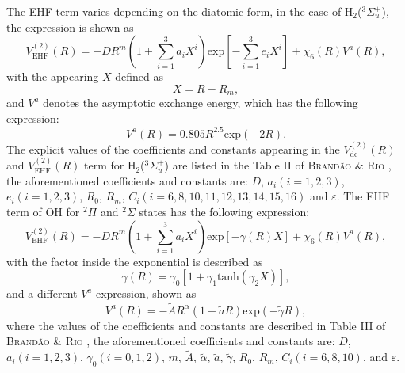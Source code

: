 \documentclass[12pt]{article}
\begin{document}
The EHF term varies depending on the diatomic form, in the case of H$_2$($^3\Sigma_u^+$), the expression is shown as
\begin{equation}
    V_{\text{EHF}}^{(2)}(R) = -DR^m\left(1+\sum_{i=1}^3a_iX^i\right)\text{exp}\left[-\sum^3_{i=1}e_iX^i\right] + \chi_6(R)V^a(R),
\label{eqehfehfh2}
\end{equation}
with the appearing $X$ defined as
\begin{equation}
    X=R-R_m,
\end{equation}
and $V^a$ denotes the asymptotic exchange energy, which has the following expression:
\begin{equation}
    V^a (R) = 0.805R^{2.5}\text{exp}(-2R).
\end{equation}
The explicit values of the coefficients and constants appearing in the $V_{\text{dc}}^{(2)}(R)$ and $V_{\text{EHF}}^{(2)}(R)$ term for H$_2$($^3\Sigma_u^+$) are listed in the Table II of \textsc{Brandão \& Rio} \cite{idx41}, the aforementioned coefficients and constants are: $D$, $a_i (i=1,2,3)$, $e_i (i=1,2,3)$, $R_0$, $R_m$,  $C_i (i=6,8,10,11,12,13,14,15,16)$ and $\varepsilon$. The EHF term of OH for $^2\Pi$ and $^2\Sigma$ states has the following expression:
\begin{equation}
    V_{\text{EHF}}^{(2)}(R) = -DR^m\left(1+\sum_{i=1}^3a_iX^i\right)\text{exp}\left[-\gamma(R)X\right] + \chi_6(R)V^a(R),
\label{eqehfehfoh}
\end{equation}
with the factor inside the exponential is described as
\begin{equation}
    \gamma(R) = \gamma_0\left[1+\gamma_1\text{tanh}(\gamma_2X)\right],
\end{equation}
and a different $V^a$ expression, shown as
\begin{equation}
    V^a(R) = -\tilde{A}R^{\tilde{\alpha}}(1+\tilde{a}R)\text{exp}(-\tilde{\gamma}R),
\end{equation}
where the values of the coefficients and constants are described in Table III of \textsc{Brandão \& Rio} \cite{idx41}, the aforementioned coefficients and constants are: $D$, $a_i (i=1,2,3)$, $\gamma_0 (i=0,1,2)$, $m$, $\tilde{A}$, $\tilde{\alpha}$, $\tilde{a}$, $\tilde{\gamma}$, $R_0$, $R_m$, $C_i (i=6,8,10)$, and $\varepsilon$.
\end{document}

